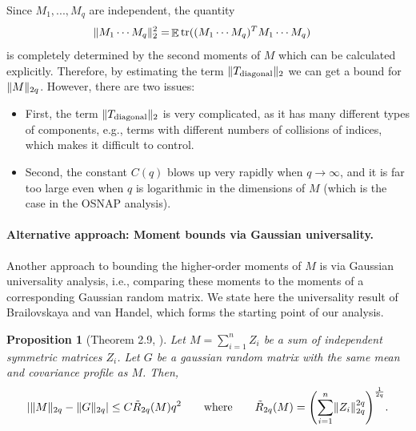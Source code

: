 \documentclass[11pt]{amsart}
\numberwithin{equation}{section}
\numberwithin{equation}{section}
\DeclareMathOperator{\E}{\mathbb{E}}
\DeclareMathOperator*{\tr}{tr}
\DeclarePairedDelimiter{\norm}{\lVert}{\rVert}
\DeclarePairedDelimiter{\abs}{\lvert}{\rvert}
\DeclarePairedDelimiter{\paren}{(}{)}
\newtheorem{proposition}[theorem]{Proposition}
\begin{document}
Since $M_1,...,M_{q}$ are independent, the quantity
\begin{align*}
    \norm{M_1 \cdots M_{q}}_2^2=&\E\tr((M_1 \cdots M_{q})^TM_1 \cdots M_{q})
\end{align*}
is completely determined by the second moments of $M$ which can be calculated explicitly.
Therefore, by estimating the term
$\norm{T_{\text{diagonal}}}_2$
we can get a bound for $\norm{M}_{2q}$. However, there are two issues:
\begin{itemize}

    \item First, the term $\norm{T_{\text{diagonal}}}_2$
is very complicated, as it has many different types of components, e.g., terms with different numbers of collisions of indices, which makes it difficult to control.
\item Second, the constant $C(q)$ blows up very rapidly when $q \to \infty$, and it is far too large even when $q$ is logarithmic in the dimensions of $M$ (which is the case in the OSNAP analysis).

\end{itemize}



\paragraph{\textbf{Alternative approach: Moment bounds via Gaussian universality.}} 

Another approach to bounding the higher-order moments of $M$ is via Gaussian universality analysis, i.e., comparing these moments to the moments of a corresponding Gaussian random matrix.
We state here the universality result of Brailovskaya and van Handel, which forms the starting point of our analysis.

\begin{proposition}[Theorem 2.9, \cite{brailovskaya2022universality}]\label{prop:bvh}
    Let $M=\sum_{i=1}^nZ_{i}$ be a sum of independent symmetric matrices $Z_i$. Let $G$ be a gaussian random matrix with the same mean and covariance profile as $M$. Then,
    \begin{equation*}
        \abs*{ \norm{M}_{2q} - \norm{G}_{2q} } \le C\tilde{R}_{2q}(M)q^2
        \qquad\text{where}\qquad \tilde{R}_{2q}(M) = \paren*{\sum_{i=1}^n \norm{Z_i}_{2q}^{2q}}^\frac{1}{2q}.
    \end{equation*}
\end{proposition}
\end{document}

